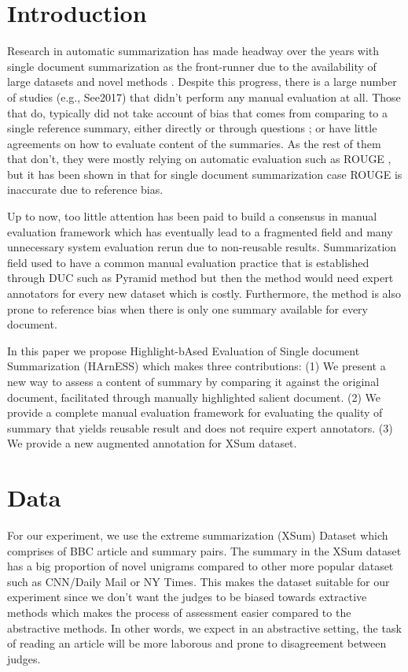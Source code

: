 \documentclass[11pt,a4paper]{article}
\begin{document}
\section{Introduction}
Research in automatic summarization has made headway over the years with single document summarization as the front-runner due to the availability of large datasets  \citep{Sandhaus2008, Hermann2015, Shashi2018} and novel methods \citep{See2017, Kryscinski2018, Shashi2018}. Despite this progress, there is a large number of studies (e.g., See2017) that didn't perform any manual evaluation at all. Those that do, typically did not take account of bias that comes from comparing to a single reference summary, either directly \citep{Celikyilmaz2018, Tan2017} or through questions \citep{Shashi2018, Narayan2018}; or have little agreements on how to evaluate content of the summaries. As the rest of them that don't, they were mostly relying on automatic evaluation such as ROUGE \citep{Lin2004}, but it has been shown in \citet{Louis2013} that for single document summarization case ROUGE is inaccurate due to reference bias.

Up to now, too little attention has been paid to build a consensus in manual evaluation framework which has eventually lead to a fragmented field and many unnecessary system evaluation rerun due to non-reusable results. Summarization field used to have a common manual evaluation practice that is established through DUC such as Pyramid method \citep{Nenkova2004} but then the method would need expert annotators for every new dataset which is costly. Furthermore, the method is also prone to reference bias when there is only one summary available for every document.


In this paper we propose Highlight-bAsed Evaluation of Single document Summarization (HArnESS) which makes three contributions: (1) We present a new way to assess a content of summary by comparing it against the original document, facilitated through manually highlighted salient document. (2) We provide a complete manual evaluation framework for evaluating the quality of summary that yields reusable result and does not require expert annotators. (3) We provide a new augmented annotation for XSum dataset.  

\section{Data}
For our experiment, we use the extreme summarization (XSum) Dataset \citep{Shashi2018} which comprises of BBC article and summary pairs. The summary in the XSum dataset has a big proportion of novel unigrams compared to other more popular dataset such as CNN/Daily Mail or NY Times. This makes the dataset suitable for our experiment since we don't want the judges to be biased towards extractive methods which makes the process of assessment easier compared to the abstractive methods. In other words, we expect in an abstractive setting, the task of reading an article will be more laborous and prone to disagreement between judges.
\end{document}

